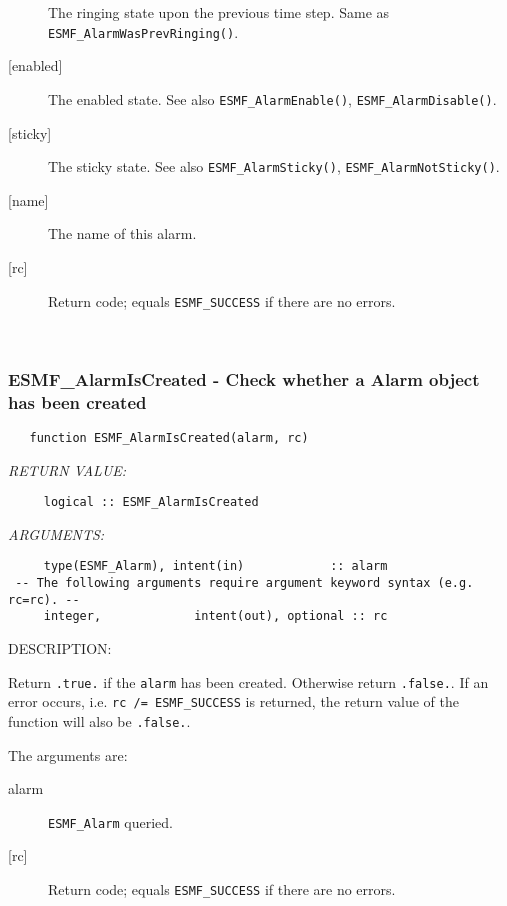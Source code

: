 \begin{description}
            \begin{sloppypar}
            The ringing state upon the previous time step. Same as
            {\tt ESMF\_AlarmWasPrevRinging()}.
            \end{sloppypar}
       \item[{[enabled]}]
            The enabled state.
            See also {\tt ESMF\_AlarmEnable()}, {\tt ESMF\_AlarmDisable()}.
       \item[{[sticky]}]
            The sticky state.
            See also {\tt ESMF\_AlarmSticky()}, {\tt ESMF\_AlarmNotSticky()}.
       \item[{[name]}]
            The name of this alarm.
       \item[{[rc]}]
            Return code; equals {\tt ESMF\_SUCCESS} if there are no errors.
       \end{description} 
 
\mbox{}\hrulefill\ 
 
\subsubsection [ESMF\_AlarmIsCreated] {ESMF\_AlarmIsCreated - Check whether a Alarm object has been created}


 
\begin{verbatim}   function ESMF_AlarmIsCreated(alarm, rc)\end{verbatim}{\em RETURN VALUE:}
\begin{verbatim}     logical :: ESMF_AlarmIsCreated\end{verbatim}{\em ARGUMENTS:}
\begin{verbatim}     type(ESMF_Alarm), intent(in)            :: alarm
 -- The following arguments require argument keyword syntax (e.g. rc=rc). --
     integer,             intent(out), optional :: rc
 \end{verbatim}
{\sf DESCRIPTION:\\ }


     Return {\tt .true.} if the {\tt alarm} has been created. Otherwise return
     {\tt .false.}. If an error occurs, i.e. {\tt rc /= ESMF\_SUCCESS} is
     returned, the return value of the function will also be {\tt .false.}.
  
   The arguments are:
     \begin{description}
     \item[alarm]
       {\tt ESMF\_Alarm} queried.
     \item[{[rc]}]
       Return code; equals {\tt ESMF\_SUCCESS} if there are no errors.
     \end{description}
   
